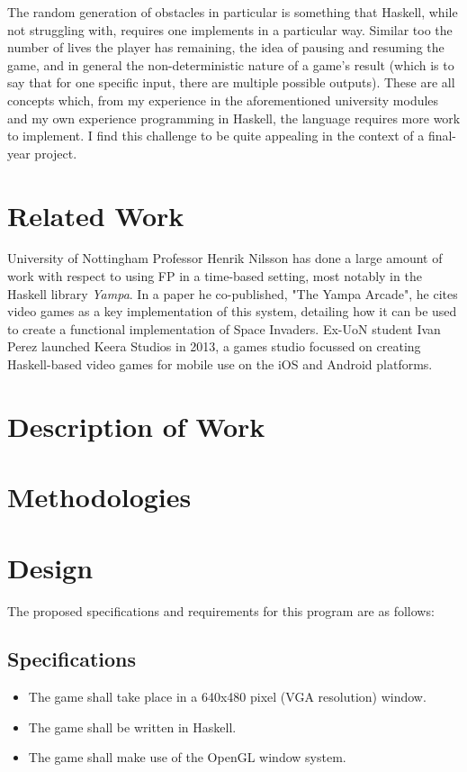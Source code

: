 \documentclass[12pt, a4paper]{report}
\begin{document}
The random generation of obstacles in particular is something that Haskell, while not struggling with, requires one implements in a particular way.
Similar too the number of lives the player has remaining, the idea of pausing and resuming the game, and in general the non-deterministic nature of a game's result (which is to say that for one specific input, there are multiple possible outputs).
These are all concepts which, from my experience in the aforementioned university modules and my own experience programming in Haskell, the language requires more work to implement.
I find this challenge to be quite appealing in the context of a final-year project.

\section{Related Work}
University of Nottingham Professor Henrik Nilsson has done a large amount of work with respect to using FP in a time-based setting, most notably in the Haskell library \textit{Yampa}.
In a paper he co-published, "The Yampa Arcade"\cite{yampaarcade}, he cites video games as a key implementation of this system, detailing how it can be used to create a functional implementation of Space Invaders.
Ex-UoN student Ivan Perez launched Keera Studios in 2013, a games studio focussed on creating Haskell-based video games for mobile use on the iOS and Android platforms.


\section{Description of Work}


\section{Methodologies}


\section{Design}
The proposed specifications and requirements for this program are as follows:

\subsection{Specifications}
\begin{itemize}
  \item The game shall take place in a 640x480 pixel (VGA resolution) window.
  \item The game shall be written in Haskell.
  \item The game shall make use of the OpenGL window system.
\end{itemize}
\end{document}
